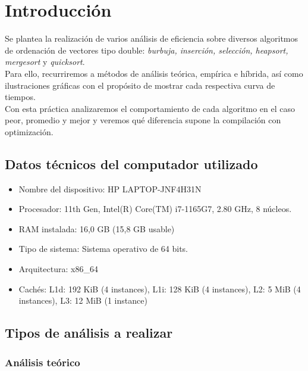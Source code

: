 \documentclass[a4paper,12pt,twoside]{article} %
\begin{document}
\section{Introducción}

Se plantea la realización de varios análisis de eficiencia sobre diversos algoritmos de ordenación de vectores tipo double: \textit{burbuja, inserción, selección, heapsort, mergesort} y  \textit{quicksort}.\\

Para ello, recurriremos a métodos de análisis teórica, empírica e híbrida, así como ilustraciones gráficas con el propósito de mostrar cada respectiva curva de tiempos.\\

Con esta práctica analizaremos el comportamiento de cada algoritmo en el caso peor, promedio y mejor y veremos qué diferencia supone la compilación con optimización.

\subsection{Datos técnicos del computador utilizado}

\begin{itemize}

	\item Nombre del dispositivo: HP LAPTOP-JNF4H31N

	\item Procesador: 11th Gen, Intel(R) Core(TM) i7-1165G7, 2.80 GHz, 8 núcleos.

	\item RAM instalada: 16,0 GB (15,8 GB usable)

	\item Tipo de sistema: Sistema operativo de 64 bits.

	\item Arquitectura: x86\_64

	\item Cachés: L1d: 192 KiB (4 instances), L1i: 128 KiB (4 instances), L2: 5 MiB (4 instances), L3: 12 MiB (1 instance)

\end{itemize}

  

\subsection{Tipos de análisis a realizar}

\subsubsection{Análisis teórico}
\end{document}
